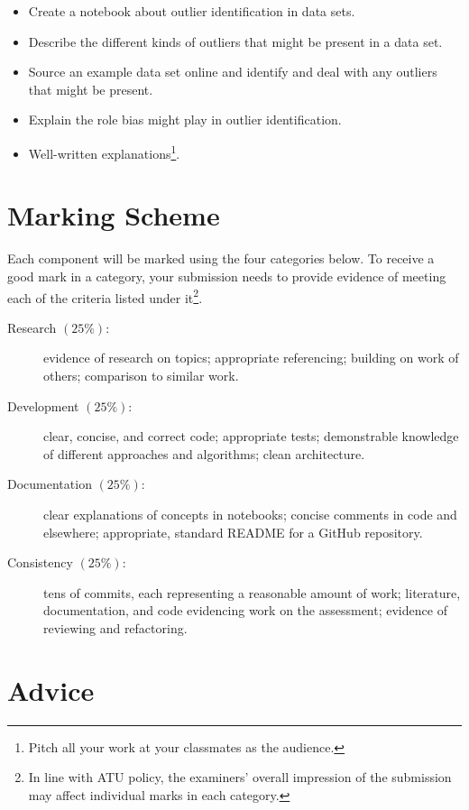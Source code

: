 \documentclass[a4paper]{tufte-handout}
\begin{document}
\begin{itemize}
  \item Create a notebook about outlier identification in data sets.
  \item Describe the different kinds of outliers that might be present in a data set.
  \item Source an example data set online and identify and deal with any outliers that might be present.
  \item Explain the role bias might play in outlier identification.
  \item Well-written explanations\footnote{Pitch all your work at your classmates as the audience.}.
\end{itemize} 


\section{Marking Scheme}
Each component will be marked using the four categories below.
To receive a good mark in a category, your submission needs to provide evidence of meeting each of the criteria listed under it\footnote{In line with ATU policy, the examiners' overall impression of the submission may affect individual marks in each category.}.

\begin{description}
  \item[Research $(25\%)$:] evidence of research on topics; appropriate referencing; building on work of others; comparison to similar work.
  \item[Development $(25\%)$:] clear, concise, and correct code; appropriate tests; demonstrable knowledge of different approaches and algorithms; clean architecture.
  \item[Documentation $(25\%)$:] clear explanations of concepts in notebooks; concise comments in code and elsewhere; appropriate, standard README for a GitHub repository.
  \item[Consistency $(25\%)$:] tens of commits, each representing a reasonable amount of work; literature, documentation, and code evidencing work on the assessment; evidence of reviewing and refactoring.
\end{description}


\section{Advice}
\end{document}
